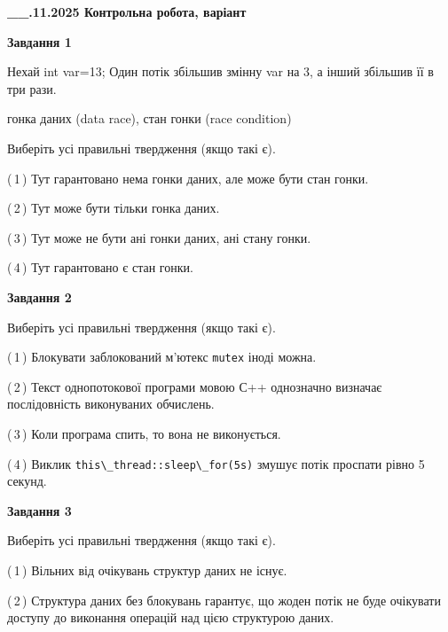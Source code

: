 \documentclass[12pt, ukrainian]{article}
\def\code#1{\Verb!#1!}
\begin{document}
\begin {large}

\textbf{\_\_.11.2025 Контрольна робота, варіант  }\par


{

\begin{center}
\textbf{Завдання 1}
\end{center}
Нехай int var=13; Один потік збільшив змінну var на 3, а інший збільшив її в три рази.

гонка даних (data race), стан гонки (race condition)

Виберіть усі правильні твердження (якщо такі є).\par
\vspace{2mm}
(\,1\,) Тут гарантовано нема гонки даних, але може бути стан гонки.%

(\,2\,) Тут може бути тільки гонка даних.%

(\,3\,) Тут може не бути ані гонки даних, ані стану гонки.%

(\,4\,) Тут гарантовано є стан гонки.%



\begin{center}
\textbf{Завдання 2}
\end{center}
Виберіть усі правильні твердження (якщо такі є).\par
\vspace{2mm}

(\,1\,) Блокувати заблокований м’ютекс  \code{mutex} іноді можна.%

(\,2\,) Текст однопотокової програми мовою С++ однозначно визначає послідовність виконуваних обчислень.%

(\,3\,) Коли програма спить, то вона не виконується.%

(\,4\,) Виклик \code{this\_thread::sleep\_for(5s)} змушує потік проспати рівно 5 секунд.%



\begin{center}
\textbf{Завдання 3}
\end{center}
Виберіть усі правильні твердження (якщо такі є).\par
\vspace{2mm}

(\,1\,) Вільних від очікувань структур даних не існує.%

(\,2\,) Структура даних без блокувань гарантує, що жоден потік не буде очікувати доступу до виконання операцій над цією структурою даних.%

}
\end{large}
\end{document}
